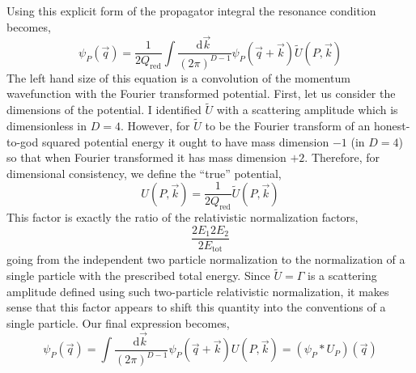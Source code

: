 \documentclass[12pt]{article}
\renewcommand{\d}[1]{ \mathrm{d}#1 \:}
\begin{document}
Using this explicit form of the propagator integral the resonance condition becomes,
\begin{equation}
[ E^2 - (Q_1 + Q_2)^2 ] \psi_P(\vec{q}) = \frac{1}{2 Q_{\mathrm{red}}} \int \frac{\d{\vec{k}}}{(2\pi)^{D-1}} \psi_P(\vec{q} + \vec{k}) \tilde{U}(P, \vec{k}) 
\end{equation}
The left hand size of this equation is a convolution of the momentum wavefunction with the Fourier transformed potential. First, let us consider the dimensions of the potential. I identified $\tilde{U}$ with a scattering amplitude which is dimensionless in $D = 4$. However, for $\tilde{U}$ to be the Fourier transform of an honest-to-god squared potential energy it ought to have mass dimension $-1$ (in $D = 4$) so that when Fourier transformed it has mass dimension $+2$. Therefore, for dimensional consistency, we define the ``true'' potential,
\begin{equation}
U(P, \vec{k}) = \frac{1}{2Q_{\mathrm{red}}} \tilde{U}(P, \vec{k}) 
\end{equation}
This factor is exactly the ratio of the relativistic normalization factors,
\begin{equation}
\frac{2 E_1 2 E_2}{2E_{\mathrm{tot}}}
\end{equation} 
going from the independent two particle normalization to the normalization of a single particle with the prescribed total energy. Since $\tilde{U} = \Gamma$ is a scattering amplitude defined using such two-particle relativistic normalization, it makes sense that this factor appears to shift this quantity into the conventions of a single particle. Our final expression becomes,
\begin{equation}
[ E^2 - (Q_1 + Q_2)^2 ] \psi_P(\vec{q}) = \int \frac{\d{\vec{k}}}{(2\pi)^{D-1}} \psi_P(\vec{q} + \vec{k}) U(P, \vec{k}) = (\psi_P * U_P) (\vec{q})
\end{equation}
 
\end{document}
